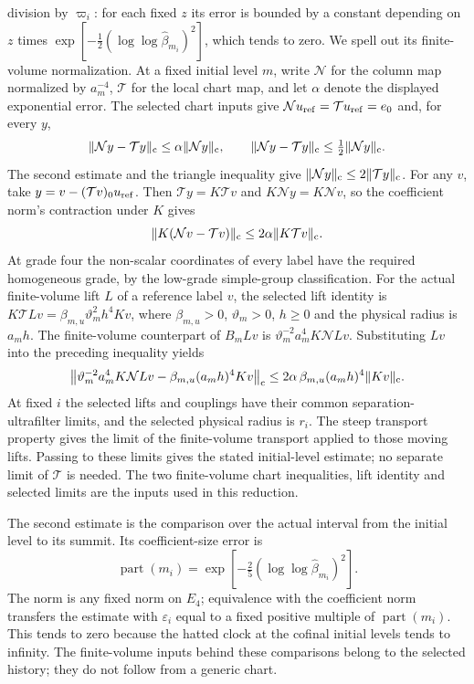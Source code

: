division by $\varpi_i$: for each fixed $z$ its error is bounded by a constant
depending on $z$ times
$\exp[-\tfrac12(\log\log\widehat\beta_{m_i})^2]$, which tends to zero.
We spell out its finite-volume normalization. At a fixed initial level $m$,
write $\mathcal N$ for the column map normalized by $a_m^{-4}$,
$\mathcal T$ for the local chart map, and let $\alpha$ denote the displayed exponential error. The
selected chart inputs give
$\mathcal N u_{\rm ref}=\mathcal T u_{\rm ref}=e_0$ and, for every $y$,
\[
 \|\mathcal Ny-\mathcal Ty\|_{\rm c}\le\alpha\|\mathcal Ny\|_{\rm c},\qquad
 \|\mathcal Ny-\mathcal Ty\|_{\rm c}\le\tfrac12\|\mathcal Ny\|_{\rm c}.
\]
The second estimate and the triangle inequality give
$\|\mathcal Ny\|_{\rm c}\le2\|\mathcal Ty\|_{\rm c}$.
For any $v$, take $y=v-(\mathcal Tv)_0u_{\rm ref}$. Then
$\mathcal Ty=K\mathcal Tv$ and $K\mathcal Ny=K\mathcal Nv$, so the
coefficient norm's contraction under $K$ gives
\[
 \|K(\mathcal Nv-\mathcal Tv)\|_{\rm c}\le2\alpha\|K\mathcal Tv\|_{\rm c}.
\]
At grade four the non-scalar coordinates of every label have the
required homogeneous grade, by the low-grade simple-group classification.
For the actual finite-volume lift $L$ of a reference label $v$, the
selected lift identity is
$K\mathcal TLv=\beta_{m,u}\vartheta_m^2 h^4Kv$, where
$\beta_{m,u}>0$, $\vartheta_m>0$, $h\ge0$ and the physical radius is
$a_mh$. The finite-volume counterpart of $B_mLv$ is
$\vartheta_m^{-2}a_m^4K\mathcal NLv$. Substituting $Lv$ into the preceding
inequality yields
\[
 \bigl\|\vartheta_m^{-2}a_m^4K\mathcal NLv-
       \beta_{m,u}(a_mh)^4Kv\bigr\|_{\rm c}
 \le2\alpha\,\beta_{m,u}(a_mh)^4\|Kv\|_{\rm c}.
\]
At fixed $i$ the selected lifts and couplings have their common
separation-ultrafilter limits, and the selected physical radius is $r_i$.
The steep transport property gives the limit of the finite-volume
transport applied to those moving lifts. Passing to these limits gives the
stated initial-level estimate; no separate limit of $\mathcal T$ is needed.
The two finite-volume chart inequalities, lift identity and selected
limits are the inputs used in this reduction.

The second estimate is the comparison over the actual interval from the
initial level to its summit. Its coefficient-size error is
\[
 \operatorname{part}(m_i)=
 \exp\!\left[-\tfrac25(\log\log\widehat\beta_{m_i})^2\right].
\]
The norm is any fixed norm on $E_4$; equivalence with the coefficient norm
transfers the estimate with $\varepsilon_i$ equal to a fixed
positive multiple of $\operatorname{part}(m_i)$. This tends to zero because
the hatted clock at the cofinal initial levels tends to infinity. The
finite-volume inputs behind these comparisons belong to the selected
history; they do not follow from a generic chart.

